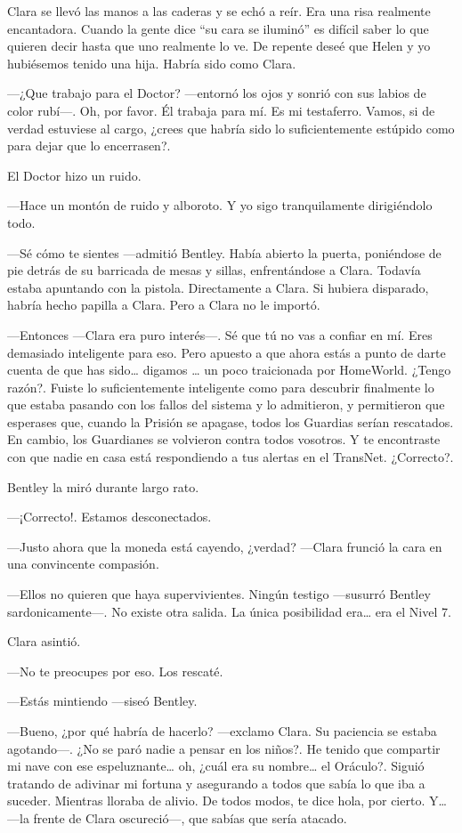 Clara se llevó las manos a las caderas y se echó a reír. Era una risa
realmente encantadora. Cuando la gente dice ``su cara se iluminó'' es
difícil saber lo que quieren decir hasta que uno realmente lo ve. De
repente deseé que Helen y yo hubiésemos tenido una hija. Habría sido
como Clara.

---¿Que trabajo para el Doctor? ---entornó los ojos y sonrió con sus
labios de color rubí---. Oh, por favor. Él trabaja para mí. Es mi
testaferro. Vamos, si de verdad estuviese al cargo, ¿crees que habría
sido lo suficientemente estúpido como para dejar que lo encerrasen?.

El Doctor hizo un ruido.

---Hace un montón de ruido y alboroto. Y yo sigo tranquilamente
dirigiéndolo todo.

---Sé cómo te sientes ---admitió Bentley. Había abierto la puerta,
poniéndose de pie detrás de su barricada de mesas y sillas,
enfrentándose a Clara. Todavía estaba apuntando con la pistola.
Directamente a Clara. Si hubiera disparado, habría hecho papilla a
Clara. Pero a Clara no le importó.

---Entonces ---Clara era puro interés---. Sé que tú no vas a confiar en
mí. Eres demasiado inteligente para eso. Pero apuesto a que ahora estás
a punto de darte cuenta de que has sido\ldots{} digamos \ldots{} un poco
traicionada por HomeWorld. ¿Tengo razón?. Fuiste lo suficientemente
inteligente como para descubrir finalmente lo que estaba pasando con los
fallos del sistema y lo admitieron, y permitieron que esperases que,
cuando la Prisión se apagase, todos los Guardias serían rescatados. En
cambio, los Guardianes se volvieron contra todos vosotros. Y te
encontraste con que nadie en casa está respondiendo a tus alertas en el
TransNet. ¿Correcto?.

Bentley la miró durante largo rato.

---¡Correcto!. Estamos desconectados.

---Justo ahora que la moneda está cayendo, ¿verdad? ---Clara frunció la
cara en una convincente compasión.

---Ellos no quieren que haya supervivientes. Ningún testigo ---susurró
Bentley sardonicamente---. No existe otra salida. La única posibilidad
era\ldots{} era el Nivel 7.

Clara asintió.

---No te preocupes por eso. Los rescaté.

---Estás mintiendo ---siseó Bentley.

---Bueno, ¿por qué habría de hacerlo? ---exclamo Clara. Su paciencia se
estaba agotando---. ¿No se paró nadie a pensar en los niños?. He tenido
que compartir mi nave con ese espeluznante\ldots{} oh, ¿cuál era su
nombre\ldots{} el Oráculo?. Siguió tratando de adivinar mi fortuna y
asegurando a todos que sabía lo que iba a suceder. Mientras lloraba de
alivio. De todos modos, te dice hola, por cierto. Y\ldots{} ---la frente
de Clara oscureció---, que sabías que sería atacado.

